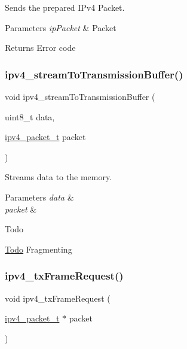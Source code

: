 Sends the prepared I\+Pv4 Packet. 


\begin{DoxyParams}{Parameters}
{\em ip\+Packet} & Packet \\
\hline
\end{DoxyParams}
\begin{DoxyReturn}{Returns}
Error code 
\end{DoxyReturn}
\mbox{\label{group__ipv4_ga9b32058fa6f24f692e0915345b3373b2}} 
\subsubsection{\texorpdfstring{ipv4\_streamToTransmissionBuffer()}{ipv4\_streamToTransmissionBuffer()}}
{\footnotesize\ttfamily void ipv4\+\_\+stream\+To\+Transmission\+Buffer (\begin{DoxyParamCaption}\item[{uint8\+\_\+t}]{data,  }\item[{\mbox{\hyperlink{group__ipv4_ga68ea36d252d9332fd5e37d9aaedd06af}{ipv4\+\_\+packet\+\_\+t}}}]{packet }\end{DoxyParamCaption})}



Streams data to the memory. 


\begin{DoxyParams}{Parameters}
{\em data} & \\
\hline
{\em packet} & \\
\hline
\end{DoxyParams}
\begin{DoxyRefDesc}{Todo}
\item[\mbox{\hyperlink{todo__todo000015}{Todo}}]Fragmenting \end{DoxyRefDesc}
\mbox{\label{group__ipv4_ga1bf24e45bf60a70b43ea1f1738c9a4c5}} 
\subsubsection{\texorpdfstring{ipv4\_txFrameRequest()}{ipv4\_txFrameRequest()}}
{\footnotesize\ttfamily void ipv4\+\_\+tx\+Frame\+Request (\begin{DoxyParamCaption}\item[{\mbox{\hyperlink{group__ipv4_ga68ea36d252d9332fd5e37d9aaedd06af}{ipv4\+\_\+packet\+\_\+t}} $\ast$}]{packet }\end{DoxyParamCaption})}



